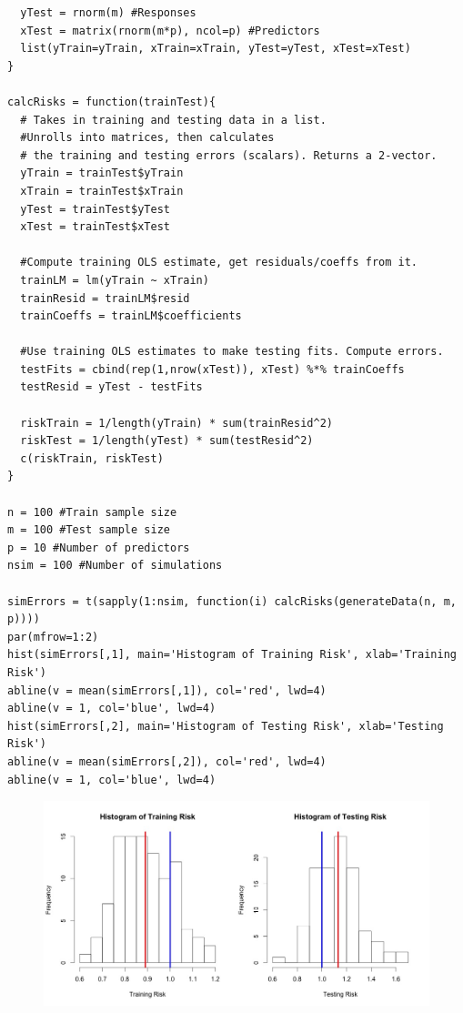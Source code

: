 \documentclass[12pt]{article}
\begin{document}
\begin{enumerate}[(a)]
\begin{lstlisting}
  yTest = rnorm(m) #Responses
  xTest = matrix(rnorm(m*p), ncol=p) #Predictors
  list(yTrain=yTrain, xTrain=xTrain, yTest=yTest, xTest=xTest)
}

calcRisks = function(trainTest){
  # Takes in training and testing data in a list.
  #Unrolls into matrices, then calculates
  # the training and testing errors (scalars). Returns a 2-vector.
  yTrain = trainTest$yTrain
  xTrain = trainTest$xTrain
  yTest = trainTest$yTest
  xTest = trainTest$xTest

  #Compute training OLS estimate, get residuals/coeffs from it.
  trainLM = lm(yTrain ~ xTrain)
  trainResid = trainLM$resid
  trainCoeffs = trainLM$coefficients

  #Use training OLS estimates to make testing fits. Compute errors.
  testFits = cbind(rep(1,nrow(xTest)), xTest) %*% trainCoeffs
  testResid = yTest - testFits
  
  riskTrain = 1/length(yTrain) * sum(trainResid^2)
  riskTest = 1/length(yTest) * sum(testResid^2)
  c(riskTrain, riskTest)
}

n = 100 #Train sample size
m = 100 #Test sample size
p = 10 #Number of predictors
nsim = 100 #Number of simulations

simErrors = t(sapply(1:nsim, function(i) calcRisks(generateData(n, m, p))))
par(mfrow=1:2)
hist(simErrors[,1], main='Histogram of Training Risk', xlab='Training Risk')
abline(v = mean(simErrors[,1]), col='red', lwd=4)
abline(v = 1, col='blue', lwd=4)
hist(simErrors[,2], main='Histogram of Testing Risk', xlab='Testing Risk')
abline(v = mean(simErrors[,2]), col='red', lwd=4)
abline(v = 1, col='blue', lwd=4)
\end{lstlisting}
\begin{figure}[H]
\includegraphics[scale=.4]{RiskHist.jpeg}
\end{figure}
\end{enumerate}
\end{document}

